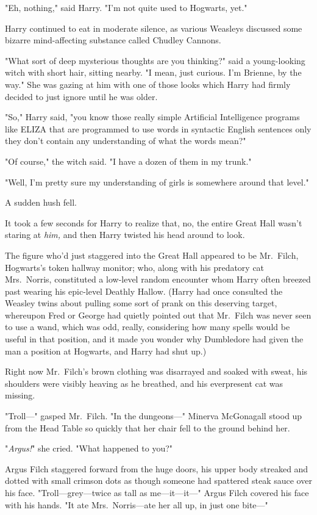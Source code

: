"Eh, nothing," said Harry. "I'm not quite used to Hogwarts, yet."

Harry continued to eat in moderate silence, as various Weasleys discussed some
bizarre mind-affecting substance called Chudley Cannons.

"What sort of deep mysterious thoughts are you thinking?" said a young-looking
witch with short hair, sitting nearby. "I mean, just curious. I'm Brienne, by
the way." She was gazing at him with one of those looks which Harry had firmly
decided to just ignore until he was older.

"So," Harry said, "you know those really simple Artificial Intelligence
programs like ELIZA that are programmed to use words in syntactic English
sentences only they don't contain any understanding of what the words mean?"

"Of course," the witch said. "I have a dozen of them in my trunk."

"Well, I'm pretty sure my understanding of girls is somewhere around that
level."

A sudden hush fell.

It took a few seconds for Harry to realize that, no, the entire Great Hall
wasn't staring at \emph{him,} and then Harry twisted his head around to look.

The figure who'd just staggered into the Great Hall appeared to be Mr.~Filch,
Hogwarts's token hallway monitor; who, along with his predatory cat
Mrs.~Norris, constituted a low-level random encounter whom Harry often breezed
past wearing his epic-level Deathly Hallow. (Harry had once consulted the
Weasley twins about pulling some sort of prank on this deserving target,
whereupon Fred or George had quietly pointed out that Mr.~Filch was never seen
to use a wand, which was odd, really, considering how many spells would be
useful in that position, and it made you wonder why Dumbledore had given the
man a position at Hogwarts, and Harry had shut up.)

Right now Mr.~Filch's brown clothing was disarrayed and soaked with sweat, his
shoulders were visibly heaving as he breathed, and his everpresent cat was
missing.

"Troll—" gasped Mr.~Filch. "In the dungeons—"
\sbreak
Minerva McGonagall stood up from the Head Table so quickly that her chair fell
to the ground behind her.

"\emph{Argus!}" she cried. "What happened to you?"

Argus Filch staggered forward from the huge doors, his upper body streaked and
dotted with small crimson dots as though someone had spattered steak sauce over
his face. "Troll—grey—twice as tall as me—it—it—" Argus Filch covered
his face with his hands. "It ate Mrs.~Norris—ate her all up, in just one
bite—"

